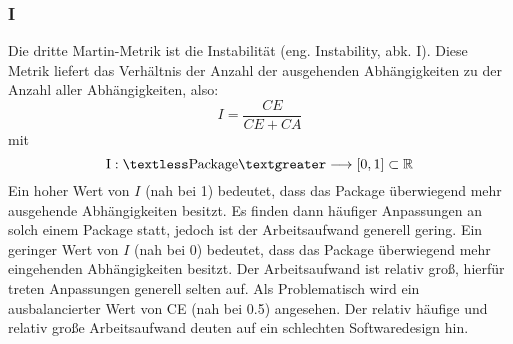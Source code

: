 \documentclass[12pt]{article}
\begin{document}

\subsubsection{I}\label{I}

Die dritte Martin-Metrik ist die Instabilität (eng. Instability, abk.
I). Diese Metrik liefert das Verhältnis der Anzahl der
ausgehenden Abhängigkeiten zu der Anzahl aller
Abhängigkeiten, also:
\[
        I = \frac{CE}{CE + CA}
\]
mit
\[
        \text{I}: \textless \text{Package} \textgreater
        \longrightarrow [0,1] \subset \mathbb{R}
\]
Ein hoher Wert von $I$ (nah bei 1) bedeutet, dass das Package
überwiegend mehr ausgehende Abhängigkeiten besitzt. Es finden
dann häufiger Anpassungen an solch einem Package statt, jedoch ist
der Arbeitsaufwand generell gering.  Ein geringer Wert von $I$
(nah bei 0) bedeutet, dass das Package überwiegend mehr
eingehenden Abhängigkeiten besitzt. Der Arbeitsaufwand ist
relativ groß, hierfür treten Anpassungen generell selten auf. Als
Problematisch wird ein ausbalancierter Wert von CE (nah bei 0.5)
angesehen. Der relativ häufige und relativ große Arbeitsaufwand deuten
auf ein schlechten Softwaredesign hin.


%
\end{document}
